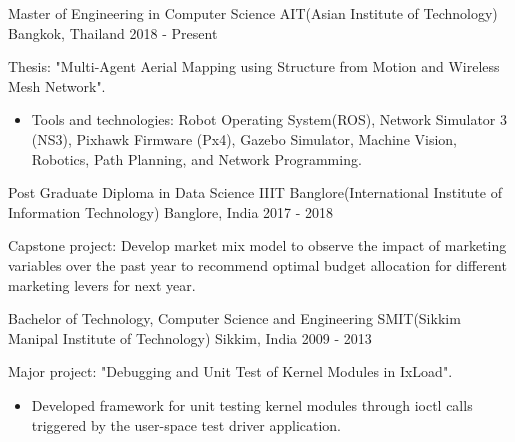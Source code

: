 

\begin{cventries}

  \cventry
    {Master of Engineering in Computer Science} %
    {AIT(Asian Institute of Technology)} %
    {Bangkok, Thailand} %
    {2018 - Present} %
    {
      \begin{cvitems} %
      \item {Thesis: "Multi-Agent Aerial Mapping using Structure from Motion and Wireless Mesh Network".
        \begin{itemize}
            \item Tools and technologies: Robot Operating System(ROS), Network Simulator 3 (NS3), Pixhawk Firmware (Px4), Gazebo Simulator, Machine Vision, Robotics, Path Planning, and Network Programming.
        \end{itemize} }
      \end{cvitems}
    }

  \cventry
    {Post Graduate Diploma in Data Science} %
    {IIIT Banglore(International Institute of Information Technology)} %
    {Banglore, India} %
    {2017 - 2018} %
    {
      \begin{cvitems} %
      \item {Capstone project: Develop market mix model to observe the impact of marketing variables over the past year to recommend optimal budget allocation for different marketing levers for next year.}
      \end{cvitems}
    }

  \cventry
    {Bachelor of Technology, Computer Science and Engineering} %
    {SMIT(Sikkim Manipal Institute of Technology)} %
    {Sikkim, India} %
    {2009 - 2013} %
    {
      \begin{cvitems} %
      \item {Major project: "Debugging and Unit Test of Kernel Modules in IxLoad".
        \begin{itemize}
            \item Developed framework for unit testing kernel modules through ioctl calls triggered by the user-space test driver application.
        \end{itemize} }
      \end{cvitems}
    }
\end{cventries}
